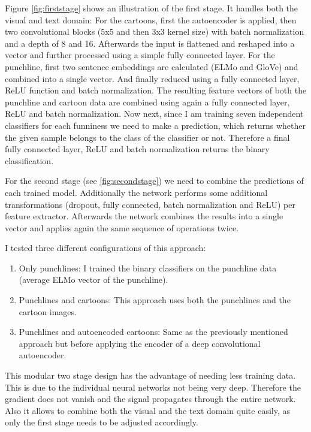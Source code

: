\documentclass[draft,final,oneside]{vutinfth} %
\begin{document}
Figure \ref{fig:firststage} shows an illustration of the first stage. It handles both the visual and text domain: For the cartoons, first the autoencoder is applied, then two convolutional blocks (5x5 and then 3x3 kernel size) with batch normalization and a depth of 8 and 16. Afterwards the input is flattened and reshaped into a vector and further processed using a simple fully connected layer. For the punchline, first two sentence embeddings are calculated (ELMo and GloVe) and combined into a single vector. And finally reduced using a fully connected layer, ReLU function and batch normalization. The resulting feature vectors of both the punchline and cartoon data are combined using again a fully connected layer, ReLU and batch normalization. Now next, since I am training seven independent classifiers for each funniness we need to make a prediction, which returns whether the given sample belongs to the class of the classifier or not. Therefore a final fully connected layer, ReLU and batch normalization returns the binary classification.

For the second stage (see \ref{fig:secondstage}) we need to combine the predictions of each trained model. Additionally the network performs some additional transformations (dropout, fully connected, batch normalization and ReLU) per feature extractor. Afterwards the network combines the results into a single vector and applies again the same sequence of operations twice.

I tested three different configurations of this approach:

\begin{enumerate}

\item Only punchlines: I trained the binary classifiers on the punchline data (average ELMo vector of the punchline).
\item Punchlines and cartoons: This approach uses both the punchlines and the cartoon images.
\item Punchlines and autoencoded cartoons: Same as the previously mentioned approach but before applying the encoder of a deep convolutional autoencoder.

\end{enumerate}

This modular two stage design has the advantage of needing less training data. This is due to the individual neural networks not being very deep. Therefore the gradient does not vanish and the signal propagates through the entire network. Also it allows to combine both the visual and the text domain quite easily, as only the first stage needs to be adjusted accordingly.
\end{document}
